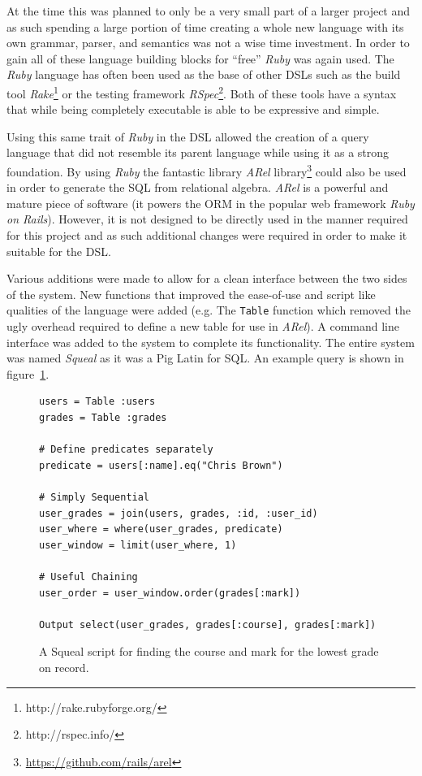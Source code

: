At the time this was planned to only be a very small part of a larger project
and as such spending a large portion of time creating a whole new language with
its own grammar, parser, and semantics was not a wise time investment. In order
to gain all of these language building blocks for ``free'' \emph{Ruby} was
again used. The \emph{Ruby} language has often been used as the base of other
\acp{DSL} such as the build tool
\emph{Rake}\footnote{http://rake.rubyforge.org/} or the testing framework
\emph{RSpec}\footnote{http://rspec.info/}. Both of these tools have a syntax
that while being completely executable is able to be expressive and simple.

Using this same trait of \emph{Ruby} in the \ac{DSL} allowed the creation of
a query language that did not resemble its parent language while using it as
a strong foundation. By using \emph{Ruby} the fantastic library \emph{ARel}
library\footnote{\url{https://github.com/rails/arel}} could also be used in
order to generate the \ac{SQL} from relational algebra. \emph{ARel} is
a powerful and mature piece of software (it powers the \ac{ORM} in the popular
web framework \emph{Ruby on Rails}). However, it is not designed to be directly
used in the manner required for this project and as such additional changes
were required in order to make it suitable for the \ac{DSL}.

Various additions were made to allow for a clean interface between the two
sides of the system. New functions that improved the ease-of-use and script
like qualities of the language were added (e.g. The \texttt{Table} function
which removed the ugly overhead required to define a new table for use in
\emph{ARel}). A command line interface was added to the system to complete its
functionality. The entire system was named \emph{Squeal} as it was a Pig Latin
for \ac{SQL}. An example query is shown in figure~\ref{fig:squeal}.

\begin{figure}
\begin{verbatim}
users = Table :users
grades = Table :grades

# Define predicates separately
predicate = users[:name].eq("Chris Brown")

# Simply Sequential
user_grades = join(users, grades, :id, :user_id)
user_where = where(user_grades, predicate)
user_window = limit(user_where, 1)

# Useful Chaining
user_order = user_window.order(grades[:mark])

Output select(user_grades, grades[:course], grades[:mark])
\end{verbatim}
  \caption{A Squeal script for finding the course and mark for the lowest
  grade on record.}
  \label{fig:squeal}
\end{figure}

